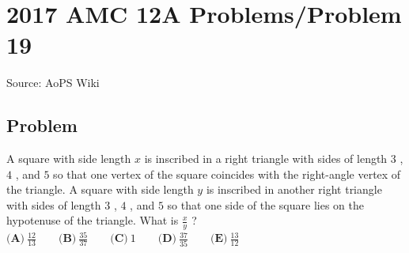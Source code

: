 \documentclass[12pt]{article}
\begin{document}
\section*{{2017 AMC 12A Problems/Problem 19}}
Source: AoPS Wiki

\subsection*{Problem}
A square with side length $x$ is inscribed in a right triangle with sides of length $3$ , $4$ , and $5$ so that one vertex of the square coincides with the right-angle vertex of the triangle. A square with side length $y$ is inscribed in another right triangle with sides of length $3$ , $4$ , and $5$ so that one side of the square lies on the hypotenuse of the triangle. What is $\frac{x}{y}$ ? $\textbf{(A)}\ \frac{12}{13} \qquad \textbf{(B)}\ \frac{35}{37} \qquad\textbf{(C)}\ 1 \qquad\textbf{(D)}\ \frac{37}{35} \qquad\textbf{(E)}\ \frac{13}{12}$
\end{document}
